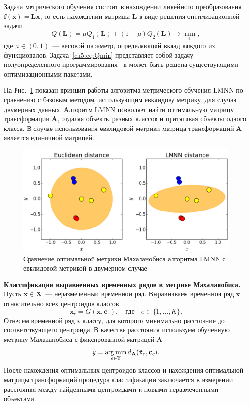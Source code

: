 Задача метрического обучения состоит в нахождении линейного преобразования $\mathbf{f}(\mathbf{x}) = \mathbf{Lx}$, то есть нахождении матрицы $\mathbf{L}$ в виде решения оптимизационной задачи
\begin{equation}
	\label{ch5:eq:Qmin}
	Q(\mathbf{L}) = \mu Q_1(\mathbf{L}) + (1 - \mu) Q_2(\mathbf{L}) \rightarrow \min_{\mathbf{L}},
\end{equation}
где $\mu \in (0, 1)$~--- весовой параметр, определяющий вклад каждого из функционалов.
Задача~\eqref{ch5:eq:Qmin} представляет собой задачу полуопределенного программирования~\cite{vandenberghe1996semidefinite} и может быть решена существующими оптимизационными пакетами.

На Рис.~\ref{ch5:fig:metric_learning_toy_example} показан принцип работы алгоритма метрического обучения LMNN по сравнению с базовым методом, использующим евклидову метрику, для случая двумерных данных. 
Алгоритм LMNN позволяет найти оптимальную матрицу трансформации $\mathbf{A}$, отдаляя объекты разных классов и притягивая объекты одного класса. 
В случае использования евклидовой метрики матрица трансформаций $\mathbf{A}$ является единичной матрицей.

\begin{figure}[ht]
	\centering
	\includegraphics[width=0.9\linewidth]{figs/ch5/metric_learning_toy_example}
	\caption{Сравнение оптимальной метрики Махаланобиса алгоритма LMNN с евклидовой метрикой в двумерном случае}
	\label{ch5:fig:metric_learning_toy_example}
\end{figure}

\textbf{Классификация выравненных временных рядов в метрике Махаланобиса.}
Пусть $\mathbf{x} \in \mathbf{X}$~--- неразмеченный временной ряд. Выравниваем временной ряд $\mathbf{x}$ относительно всех центроидов классов
\[
	\mathbf{\hat{x}}_e = G(\mathbf{x}, \mathbf{c}_e), \quad \text{где} \quad e \in \{1, \dots, K\}.
\]
Отнесем временной ряд к классу, для которого минимально расстояние до соответствующего центроида. В качестве расстояния используем обученную метрику Махаланобиса с фиксированной матрицей $\mathbf{A}$
\[
	\hat{y} = \mathop{\arg \min}\limits_{e \in \mathbb{Y}} d_\mathbf{A}(\mathbf{\hat{x}}_e, \mathbf{c}_e).
\]
После нахождения оптимальных центроидов классов и нахождения оптимальной матрицы трансформаций процедура классификации заключается в измерении расстояния между найденными центроидами и новыми неразмеченными объектами.

